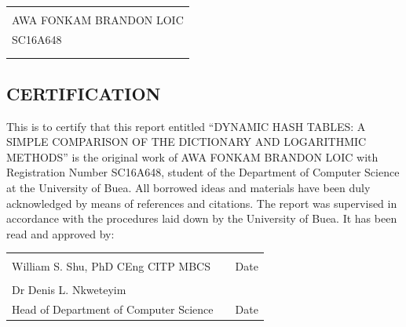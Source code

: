\documentclass[a4paper,12pt, openany]{book}
\begin{document}
\begin{tabular}{l}
	\makebox[2.8in]{\hrulefill}\\
	
	\hspace*{0mm}\textsc{AWA FONKAM BRANDON LOIC}\\
	\hspace*{0mm}\textsc{SC16A648}\vspace{.5in}\\
	
	\hspace*{0mm}{Department of Computer Science}\\
	\hspace*{0mm}{Faculty of Science}
	
	
\end{tabular}

\newpage
\vspace*{0.25\textheight}
\begin{center}
	\section*{CERTIFICATION}
	\vspace*{.2in}
\end{center}
\thispagestyle{empty}

This is to certify that this report entitled “DYNAMIC HASH TABLES: A SIMPLE COMPARISON OF THE DICTIONARY AND LOGARITHMIC METHODS” is the original work of AWA FONKAM BRANDON LOIC with Registration Number SC16A648, student of the Department of
Computer Science at the University of Buea. All borrowed ideas and materials have been duly
acknowledged by means of references and citations. The report was supervised in accordance with the
procedures laid down by the University of Buea. It has been read and approved by:
\\[1.0cm]

\begin{tabular}{lcc}
	\makebox[2.4in]{\hrulefill} & \hspace*{.5in}& \makebox[2in]{\hrulefill}\\
	
	\hspace*{0mm}William S. Shu, PhD CEng CITP MBCS
	&\hspace*{1in}& Date\\[2cm]
	
	\makebox[2.4in]{\hrulefill} & \hspace*{1in} & \makebox[2in]{\hrulefill}\\
	Dr Denis L. Nkweteyim\\
	Head of Department of Computer Science &\hspace*{.5in}
	&
	Date\\
	
\end{tabular}
\end{document}
